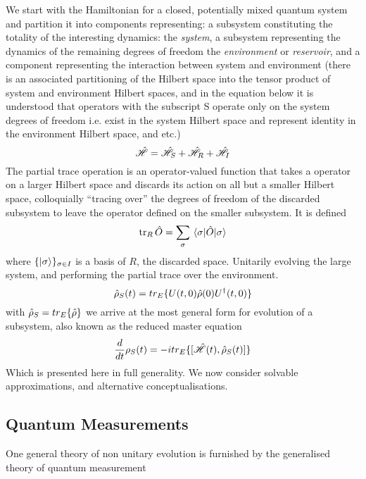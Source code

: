We start with the Hamiltonian for a closed, potentially mixed quantum system and partition it into components representing: a subsystem constituting the totality of the interesting dynamics: the \emph{system}, a subsystem representing the dynamics of the remaining degrees of freedom the \emph{environment} or \emph{reservoir}, and a component representing the interaction between system and environment (there is an associated partitioning of the Hilbert space into the tensor product of system and environment Hilbert spaces, and in the equation below it is understood that operators with the subscript S operate only on the system degrees of freedom i.e. exist in the system Hilbert space and represent identity in the environment Hilbert space, and etc.)
\begin{equation}
	\hat{\mathscr{H}} = \hat{\mathscr{H}}_S +\hat{\mathscr{H}}_R + \hat{\mathscr{H}}_I
\end{equation}
The partial trace operation is an operator-valued function that takes a operator on a larger Hilbert space and discards its action on all but a smaller Hilbert space, colloquially ``tracing over'' the degrees of freedom of the discarded subsystem to leave the operator defined on the smaller subsystem.
It is defined 
\begin{equation}
  \tr_R{\hat{O}} = \sum_\sigma\ev{\hat{O}}{\sigma}
  \label{trace}
\end{equation}
where $\{\ket{\sigma}\}_{\sigma \in I}$ is a basis of $R$, the discarded space.
Unitarily evolving the large system, and performing the partial trace over the environment.
\begin{equation}
	\hat{\rho}_S (t) = tr_E \{U(t, 0) \hat{\rho} (0) U^\dagger (t, 0) \}
\end{equation}
with $\hat{\rho}_S = tr_E\{\hat{\rho} \}$ we arrive at the most general form for evolution of a subsystem, also known as the reduced master equation
\begin{equation}
	\frac{d}{dt} \rho_S (t) = -itr_E\{[\hat{\mathscr{H}}(t), \hat{\rho}_S(t)]\}
        \label{general}
\end{equation}
Which is presented here in full generality. We now consider solvable approximations, and alternative conceptualisations.
\subsection{Quantum Measurements}
One general theory of non unitary evolution is furnished by the generalised theory of quantum measurement \cite{Wiseman2010a}
